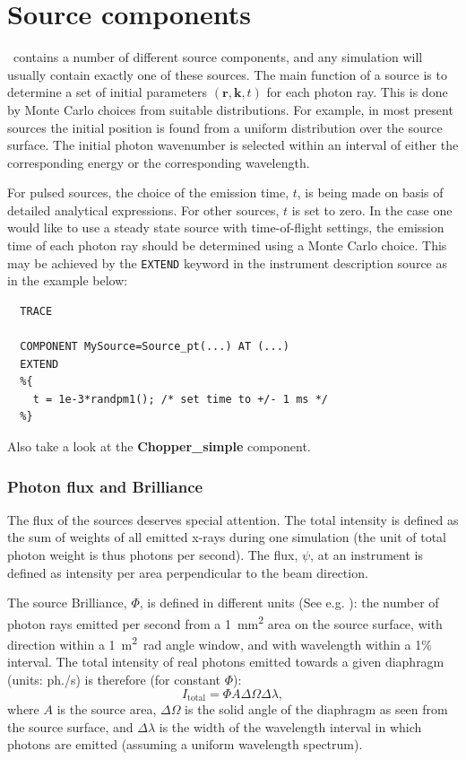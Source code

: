 
\chapter{Source components}
\label{c:sources}

\MCX\ contains a number of different source components,
and any simulation will usually contain exactly one of these sources.
The main function of a source is to determine a set of initial
parameters $(\mathbf{r}, \mathbf{k}, t)$
for each photon ray. This is done by Monte Carlo choices from
suitable distributions. For example, in most present sources
the initial position is
found from a uniform distribution over the source surface.
The initial photon wavenumber
is selected within an interval of either the corresponding energy or the corresponding wavelength.

For pulsed sources, the choice of the emission time, $t$,
is being made on basis of detailed analytical expressions.
For other sources, $t$ is set to zero.
In the case one would like to use a steady state source
with time-of-flight settings,
the emission time of each photon ray should be determined using
a Monte Carlo choice. This may be achieved by
the \verb+EXTEND+ keyword in the instrument description source
as in the example below:

\begin{verbatim}
  TRACE

  COMPONENT MySource=Source_pt(...) AT (...)
  EXTEND
  %{
    t = 1e-3*randpm1(); /* set time to +/- 1 ms */
  %}
\end{verbatim}
Also take a look at the \textbf{Chopper\_simple} component.

\subsection{Photon flux and Brilliance}
\label{s:xray-flux}
The flux of the sources deserves special attention. The total
intensity is defined as the sum of weights of all emitted x-rays
during one simulation
(the unit of total photon weight is thus photons per second).
The flux, $\psi$, at an instrument is defined as intensity per area perpendicular
to the beam direction.

The source Brilliance, $\Phi$, is defined in different units (See e.g. \cite{als2011elements}):
the number of photon rays emitted per second from a
\SI{1}{\square mm} area on the source surface,
with direction within a 1~\si{\square m \radian} angle window,
and with wavelength within a 1\% interval.
The total intensity of real photons emitted towards a given diaphragm
(units: ph./s) is therefore (for constant $\Phi$):
\begin{equation}
I_\mathrm{total} = \Phi A \Delta\Omega \Delta\lambda ,
\end{equation}
where $A$ is the source area, $\Delta\Omega$ is the solid angle of the
diaphragm as seen from the source surface, and $\Delta\lambda$ is the
width of the wavelength interval in which photons are emitted (assuming
a uniform wavelength spectrum).

